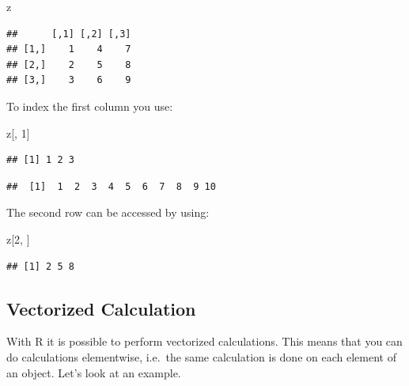 \documentclass[
]{book}
\newenvironment{Shaded}{\begin{snugshade}}{\end{snugshade}}
\newcommand{\DecValTok}[1]{\textcolor[rgb]{0.00,0.00,0.81}{#1}}
\newcommand{\NormalTok}[1]{#1}
\newcommand{\OperatorTok}[1]{\textcolor[rgb]{0.81,0.36,0.00}{\textbf{#1}}}
\begin{document}
\begin{Shaded}
\begin{Highlighting}[]
\NormalTok{z}
\end{Highlighting}
\end{Shaded}

\begin{verbatim}
##      [,1] [,2] [,3]
## [1,]    1    4    7
## [2,]    2    5    8
## [3,]    3    6    9
\end{verbatim}

To index the first column you use:

\begin{Shaded}
\begin{Highlighting}[]
\NormalTok{z[, }\DecValTok{1}\NormalTok{]}
\end{Highlighting}
\end{Shaded}

\begin{verbatim}
## [1] 1 2 3
\end{verbatim}

\begin{Shaded}
\end{Shaded}

\begin{verbatim}
##  [1]  1  2  3  4  5  6  7  8  9 10
\end{verbatim}

The second row can be accessed by using:

\begin{Shaded}
\begin{Highlighting}[]
\NormalTok{z[}\DecValTok{2}\NormalTok{, ]}
\end{Highlighting}
\end{Shaded}

\begin{verbatim}
## [1] 2 5 8
\end{verbatim}

\hypertarget{vectorized-calculation}{%
\subsection{Vectorized Calculation}\label{vectorized-calculation}}

With R it is possible to perform vectorized calculations. This means that you can do calculations elementwise, i.e.~the same calculation is done on each element of an object. Let's look at an example.
\end{document}
